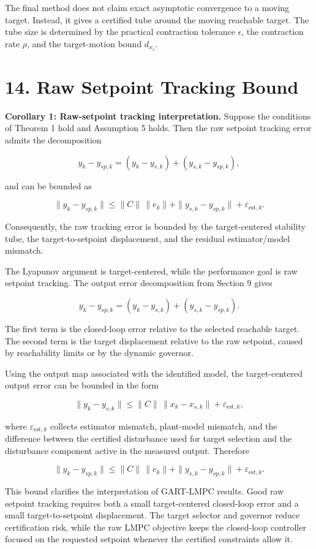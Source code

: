 \documentclass[11pt]{article}
\begin{document}
The final method does not claim exact asymptotic convergence to a moving target. Instead, it gives a certified tube around the moving reachable target. The tube size is determined by the practical contraction tolerance $\epsilon$, the contraction rate $\rho$, and the target-motion bound $d_{x_s}$.


\section*{14. Raw Setpoint Tracking Bound}

\textbf{Corollary 1: Raw-setpoint tracking interpretation.}
Suppose the conditions of Theorem 1 hold and Assumption 5 holds. Then the raw setpoint tracking error admits the decomposition

\[
y_k-y_{sp,k}
=
(y_k-y_{s,k})+(y_{s,k}-y_{sp,k}),
\]

and can be bounded as

\[
\|y_k-y_{sp,k}\|
\le
\|C\|\,\|e_k\|
+
\|y_{s,k}-y_{sp,k}\|
+
\varepsilon_{\mathrm{est},k}.
\]

Consequently, the raw tracking error is bounded by the target-centered stability tube, the target-to-setpoint displacement, and the residual estimator/model mismatch.

The Lyapunov argument is target-centered, while the performance goal is raw setpoint tracking. The output error decomposition from Section 9 gives


\[
y_k-y_{sp,k}
=
(y_k-y_{s,k})+(y_{s,k}-y_{sp,k}).
\]

The first term is the closed-loop error relative to the selected reachable target. The second term is the target displacement relative to the raw setpoint, caused by reachability limits or by the dynamic governor.


Using the output map associated with the identified model, the target-centered output error can be bounded in the form


\[
\|y_k-y_{s,k}\|
\le
\|C\|\,\|x_k-x_{s,k}\|+\varepsilon_{\mathrm{est},k},
\]

where $\varepsilon_{\mathrm{est},k}$ collects estimator mismatch, plant-model mismatch, and the difference between the certified disturbance used for target selection and the disturbance component active in the measured output. Therefore


\[
\|y_k-y_{sp,k}\|
\le
\|C\|\,\|e_k\|
+
\|y_{s,k}-y_{sp,k}\|
+
\varepsilon_{\mathrm{est},k}.
\]

This bound clarifies the interpretation of GART-LMPC results. Good raw setpoint tracking requires both a small target-centered closed-loop error and a small target-to-setpoint displacement. The target selector and governor reduce certification risk, while the raw LMPC objective keeps the closed-loop controller focused on the requested setpoint whenever the certified constraints allow it.
\end{document}
